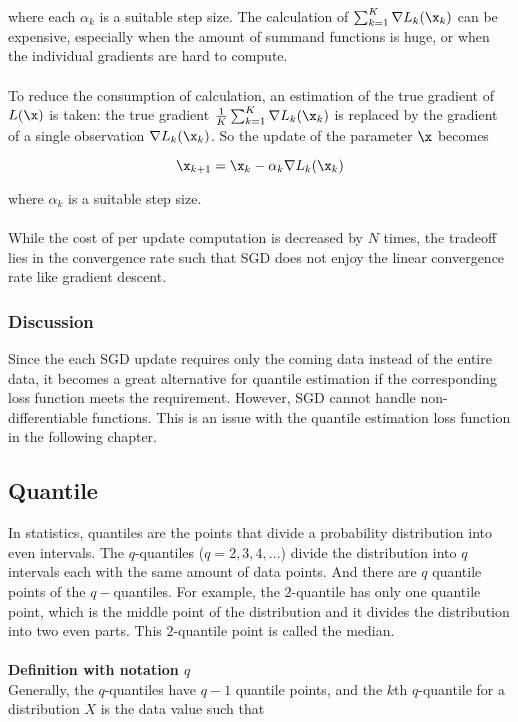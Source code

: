         
        where each $\alpha_k$ is a suitable step size. The calculation of $\sum_{k=1}^{K} \nabla L_k(\x_k)$ can be
        expensive, especially when the amount of summand functions is huge, or when the individual gradients are hard to
        compute. 
        \\\\
        To reduce the consumption of calculation, an estimation of the true gradient of $L(\x)$ is taken: 
        the true gradient $\frac{1}{K} \sum_{k=1}^{K} \nabla L_k(\x_k)$ is replaced by the gradient of a single observation $\nabla L_k(\x_k)$. 
        So the update of the parameter $\x$ becomes
        
        \begin{equation}
            \x_{k+1} = \x_{k} - \alpha_k \nabla L_k(\x_k)
        \end{equation}
        
        where $\alpha_k$ is a suitable step size. 
        \\\\
        While the cost of per update computation is decreased by $N$ times, the tradeoff lies in the convergence rate such that SGD does not enjoy the linear convergence rate like gradient descent.

\subsubsection{Discussion}
Since the each SGD update requires only the coming data instead of the entire data, it becomes a great alternative for quantile estimation if the corresponding loss function meets the requirement.
However, SGD cannot handle non-differentiable functions. This is an issue with the quantile estimation loss function in the following chapter.


\subsection{Quantile}
\label{subsec: quant}

In statistics, quantiles are the points that divide a probability distribution into even intervals.
The $q$-quantiles ($q = 2,3,4,...$) divide the distribution into $q$ intervals each with the same amount of data points.
And there are $q$ quantile points of the $q-$quantiles.
For example, the $2$-quantile has only one quantile point, which is the middle point of the distribution
and it divides the distribution into two even parts. This $2$-quantile point is called the median.
        \\\\
    \textbf{Definition with notation $q$} \\
    Generally, the $q$-quantiles have $q-1$ quantile points, and the $k$th $q$-quantile for a 
    distribution $X$ is the data value such that
    
